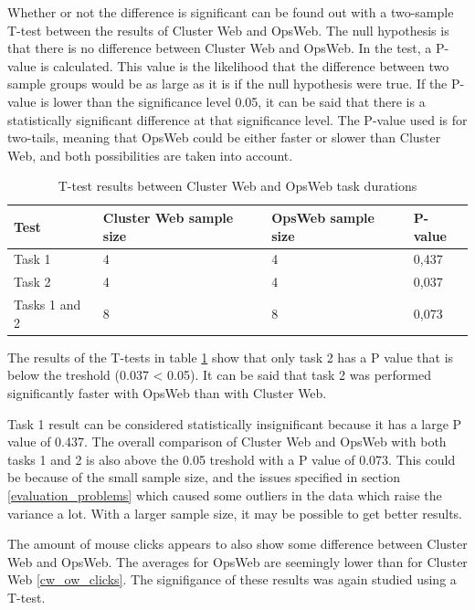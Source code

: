 Whether or not the difference is significant can be found out with a two-sample T-test \cite{student1908probable, t_test} between the results of Cluster Web and OpsWeb. The null hypothesis is that there is no difference between Cluster Web and OpsWeb. In the test, a P-value is calculated. This value is the likelihood that the difference between two sample groups would be as large as it is if the null hypothesis were true. If the P-value is lower than the significance level 0.05, it can be said that there is a statistically significant difference at that significance level. The P-value used is for two-tails, meaning that OpsWeb could be either faster or slower than Cluster Web, and both possibilities are taken into account.

\begin{table}[!ht]
\def\arraystretch{1.1}%
    \begin{center}
    \caption{T-test results between Cluster Web and OpsWeb task durations}
    \label{cw_ow_times_t_test}
    \begin{tabular}{| l | l | l | l | }
    \hline
    Test & Cluster Web sample size & OpsWeb sample size  & P-value   \\
    \hline
    Task 1 & 4 & 4 & 0,437 \\
    Task 2 & 4 & 4 &  0,037\\
    Tasks 1 and 2 & 8 & 8 & 0,073\\
    \hline
    \end{tabular}
    \end{center}
\end{table}

The results of the T-tests in table \ref{cw_ow_times_t_test} show that only task 2 has a P value that is below the treshold (0.037 < 0.05). It can be said that task 2 was performed significantly faster with OpsWeb than with Cluster Web.

Task 1 result can be considered statistically insignificant because it has a large P value of 0.437. The overall comparison of Cluster Web and OpsWeb with both tasks 1 and 2 is also above the 0.05 treshold with a P value of 0.073. This could be because of the small sample size, and the issues specified in section \ref{evaluation_problems} which caused some outliers in the data which raise the variance a lot. With a larger sample size, it may be possible to get better results.

The amount of mouse clicks appears to also show some difference between Cluster Web and OpsWeb. The averages for OpsWeb are seemingly lower than for Cluster Web \ref{cw_ow_clicks}. The signifigance of these results was again studied using a T-test.

